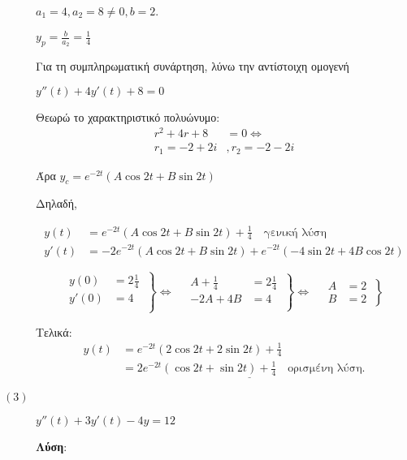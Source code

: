 \documentclass[a4paper,12pt]{article}
\begin{document}
\begin{description}
\vspace{\baselineskip}

$a_1=4, a_2=8\neq 0, b=2$.

$y_p=\frac{b}{a_2}=\frac{1}{4}$

Για τη συμπληρωματική συνάρτηση, λύνω την αντίστοιχη ομογενή

$y''(t) +4y'(t) + 8 = 0$

Θεωρώ το χαρακτηριστικό πολυώνυμο:
\begin{align*}
r^2+4r+8&=0 \Leftrightarrow \\
r_1=-2+2i&, r_2 = -2-2i
\end{align*}

Άρα $y_c=e^{-2t}(A\cos 2t +B\sin 2t)$

Δηλαδή,

\begin{align*}
y(t) &= e^{-2t}(A\cos 2t +B\sin 2t) + \frac{1}{4} \quad \text{γενική λύση} \\
y'(t) &= -2e^{-2t}(A\cos 2t +B\sin 2t)+e^{-2t}(-4\sin 2t + 4B\cos 2t)
\end{align*}

\[
  \left.\begin{aligned}
y(0)&=2\frac{1}{4} \\
y'(0)&=4\\
  \end{aligned}\:\right\}\Leftrightarrow \quad
 \left.\begin{aligned}
A+\frac{1}{4}&=2\frac{1}{4}\\
-2A+4B&=4\\
  \end{aligned}\:\right\}\Leftrightarrow \quad
 \left.\begin{aligned}
A&=2\\
B&=2
  \end{aligned}\:\right\}
\]


Τελικά: \begin{align*}y(t) &= e^{-2t}(2\cos 2t +2\sin 2t) + \frac{1}{4}\\ &= \underline{2e^{-2t}(\cos 2t +\sin 2t) + \frac{1}{4}\quad \text{ορισμένη λύση}}.\end{align*}



\vspace{\baselineskip}


\item [$(3)$] $\boxed{y''(t)+3y'(t) -4y=12}$

\textbf{Λύση}:

\vspace{\baselineskip}


\end{description}
\end{document}
